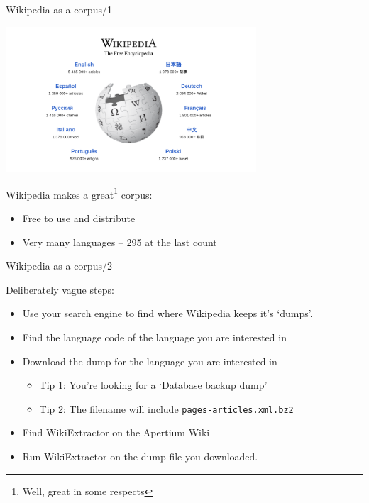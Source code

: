 \documentclass[10pt, compress]{beamer}
\begin{document}
\begin{frame}{Wikipedia as a corpus/1}

\begin{center}
\includegraphics[width=0.70\textwidth]{graphics/wikipedia-front.png}
\end{center}

Wikipedia makes a great\footnote{Well, great in some respects} corpus:

\begin{itemize}
   \item Free to use and distribute
   \item Very many languages -- 295 at the last count
\end{itemize}

\end{frame}

\begin{frame}{Wikipedia as a corpus/2}

Deliberately vague steps:

\begin{itemize}
  \item Use your search engine to find where Wikipedia keeps it's `dumps'.
  \item Find the language code of the language you are interested in
  \item Download the dump for the language you are interested in
  \begin{itemize}
    \item Tip 1: You're looking for a `Database backup dump'
    \item Tip 2: The filename will include {\tt pages-articles.xml.bz2}
  \end{itemize}
  \item Find WikiExtractor on the Apertium Wiki
  \item Run WikiExtractor on the dump file you downloaded. 
\end{itemize}

\end{frame}
\end{document}

